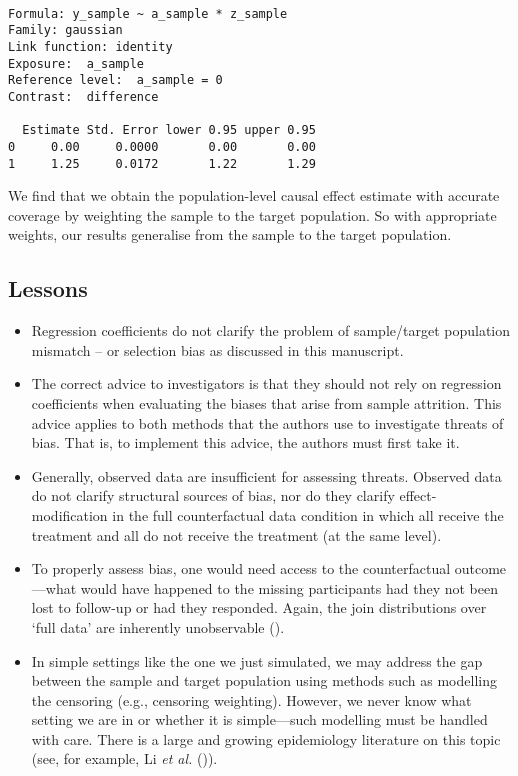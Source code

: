 \documentclass[
  single column]{article}
\providecommand{\tightlist}{%
  \setlength{\itemsep}{0pt}\setlength{\parskip}{0pt}}\usepackage{longtable,booktabs,array}
\begin{document}
\begin{verbatim}

Formula: y_sample ~ a_sample * z_sample
Family: gaussian 
Link function: identity 
Exposure:  a_sample 
Reference level:  a_sample = 0 
Contrast:  difference 

  Estimate Std. Error lower 0.95 upper 0.95
0     0.00     0.0000       0.00       0.00
1     1.25     0.0172       1.22       1.29
\end{verbatim}

We find that we obtain the population-level causal effect estimate with
accurate coverage by weighting the sample to the target population. So
with appropriate weights, our results generalise from the sample to the
target population.

\subsection{Lessons}\label{lessons}

\begin{itemize}
\tightlist
\item
  Regression coefficients do not clarify the problem of sample/target
  population mismatch -- or selection bias as discussed in this
  manuscript.
\item
  The correct advice to investigators is that they should not rely on
  regression coefficients when evaluating the biases that arise from
  sample attrition. This advice applies to both methods that the authors
  use to investigate threats of bias. That is, to implement this advice,
  the authors must first take it.
\item
  Generally, observed data are insufficient for assessing threats.
  Observed data do not clarify structural sources of bias, nor do they
  clarify effect-modification in the full counterfactual data condition
  in which all receive the treatment and all do not receive the
  treatment (at the same level).
\item
  To properly assess bias, one would need access to the counterfactual
  outcome---what would have happened to the missing participants had
  they not been lost to follow-up or had they responded. Again, the join
  distributions over `full data' are inherently unobservable
  ().
\item
  In simple settings like the one we just simulated, we may address the
  gap between the sample and target population using methods such as
  modelling the censoring (e.g., censoring weighting). However, we never
  know what setting we are in or whether it is simple---such modelling
  must be handled with care. There is a large and growing epidemiology
  literature on this topic (see, for example, Li \emph{et al.}
  ()).
\end{itemize}
\end{document}
